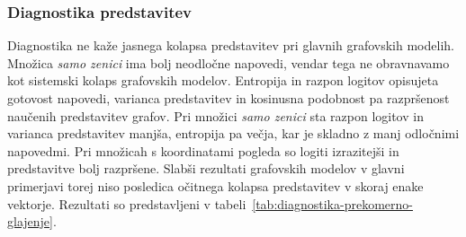 

\subsubsection*{Diagnostika predstavitev}
\label{app:diagnostika-prekomerno-glajenje}

Diagnostika ne kaže jasnega kolapsa predstavitev pri glavnih grafovskih modelih.
Množica \emph{samo zenici} ima bolj neodločne napovedi, vendar tega ne obravnavamo kot sistemski kolaps grafovskih modelov.
Entropija in razpon logitov opisujeta gotovost napovedi, varianca predstavitev in kosinusna podobnost pa razpršenost naučenih predstavitev grafov.
Pri množici \emph{samo zenici} sta razpon logitov in varianca predstavitev manjša, entropija pa večja, kar je skladno z manj odločnimi napovedmi.
Pri množicah s koordinatami pogleda so logiti izrazitejši in predstavitve bolj razpršene.
Slabši rezultati grafovskih modelov v glavni primerjavi torej niso posledica očitnega kolapsa predstavitev v skoraj enake vektorje.
Rezultati so predstavljeni v tabeli~\ref{tab:diagnostika-prekomerno-glajenje}.


